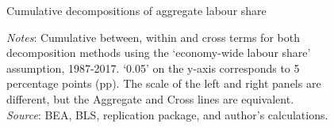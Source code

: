 \begin{figure}[h]
  \centering
\caption{\normalsize Cumulative decompositions of aggregate labour share}
\vfill
\begin{minipage}{\linewidth}
    \caption*{\textit{Notes}: Cumulative between, within and cross terms for both decomposition methods using the `economy-wide labour share' assumption, 1987-2017. `0.05' on the y-axis corresponds to 5 percentage points (pp). The scale of the left and right panels are different, but the Aggregate and Cross lines are equivalent. \\
    \textit{Source}: BEA, BLS, \citet{mendieta-munozDeclineUSLabor2021} replication package, and author's calculations.}
\end{minipage}
\label{fig:decomp_4}
\end{figure}


